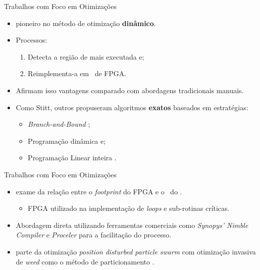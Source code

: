    \begin{frame}{Trabalhos com Foco em Otimizações} \vspace{-1em}
      \begin{itemize}
         \setlength{\itemsep}{1.2em}
         \item \cite{Stitt2003} pioneiro no método de otimização \textbf{dinâmico}.
         
         \item Processos:
         \begin{enumerate}
            \setlength{\itemsep}{0.8em}
            \item Detecta a região de mais executada e;
            \item Reimplementa-a em \hardware\ de FPGA.
         \end{enumerate}
      
         \item Afirmam isso vantagens comparado com abordagens tradicionais manuais.
         
         \item Como Stitt, outros propuseram algoritmos \textbf{exatos} baseados em estratégias:
         \begin{itemize}
            \setlength{\itemsep}{0.8em}
            \item \textit{Branch-and-Bound} \cite{Jigang2004, Mann2007, Strachacki2008};
            \item Programação dinâmica \cite{Madsen1997, Wu2006} e;
            \item Programação Linear inteira \cite{Niemann1997}.
         \end{itemize}
      \end{itemize}
   \end{frame}

   \begin{frame}{Trabalhos com Foco em Otimizações} \vspace{-1em}
      \begin{itemize}
         \setlength{\itemsep}{1.8em}
         \item \cite{Nematbakhsh_theeffect} exame da relação entre o \textit{footprint} do FPGA e o \speedup\ do \software.
         \begin{itemize}
            \item FPGA utilizado na implementação de \textit{loops} e sub-rotinas críticas.
         \end{itemize}
      
         \item Abordagem direta utilizando ferramentas comerciais como \textit{Synopys' Nimble Compiler} e \textit{Proceler} para a facilitação do processo.
         
         \item \cite{Yan2017} parte da otimização \textit{position disturbed particle swarm} com otimização invasiva de \textit{weed} como o método de particionamento \hs.
      \end{itemize}
   \end{frame}

